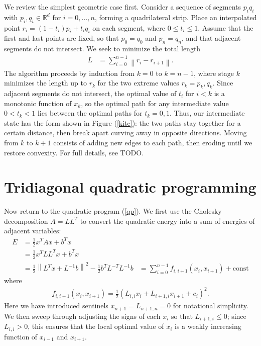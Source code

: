 \documentclass[11pt]{article}
\newcommand{\TODO}{{\color{red} TODO}}
\begin{document}
We review the simplest geometric case first.  Consider a sequence of segments $p_i q_i$ with $p_i, q_i \in \mathbb{R}^d$ for $i = 0, \ldots, n$, forming a quadrilateral strip.  Place an interpolated point
$r_i = (1-t_i) p_i + t_i q_i$ on each segment, where $0 \le t_i \le 1$.  Assume that the first and last points are fixed, so that $p_0 = q_0$ and $p_n = q_n$, and that adjacent segments do not intersect.
We seek to minimize the total length
\begin{align*}
L &= \sum_{i=0}^{n-1} \left\| r_i - r_{i+1} \right\|.
\end{align*}
The algorithm proceeds by induction from $k = 0$ to $k = n-1$, where stage $k$ minimizes the length up to $r_k$ for the two extreme values $r_k = p_k, q_k$.  Since adjacent segments do not intersect, the optimal value
of $t_i$ for $i < k$ is a monotonic function of $x_k$, so the optimal path for any intermediate value $0 < t_k < 1$ lies between the optimal paths for $t_k = 0,1$.  Thus, our intermediate state has the form shown in
Figure (\ref{kite}): the two paths stay together for a certain distance, then break apart curving away in opposite directions.  Moving from $k$ to $k+1$ consists of adding new edges to each path, then eroding until
we restore convexity.  For full details, see \TODO.

\section{Tridiagonal quadratic programming}

Now return to the quadratic program (\ref{qp}).  We first use the Cholesky decomposition $A = L L^T$ to convert the quadratic energy into a sum of energies of adjacent variables:
\begin{align*}
E &= \frac{1}{2} x^T A x + b^T x  \\
  &= \frac{1}{2} x^T L L^T x + b^T x \\
  &= \frac{1}{2} \left\|L^T x + L^{-1}b \right\|^2 - \frac{1}{2} b^T L^{-T} L^{-1} b
  &= \sum_{i=0}^{n-1} f_{i,i+1}(x_i,x_{i+1}) + \textrm{const}
\end{align*}
where
\begin{align} \label{quadratic}
f_{i,i+1}(x_i,x_{i+1}) = \frac{1}{2} (L_{i,i} x_i + L_{i+1,i} x_{i+1} + c_i)^2.
\end{align}
Here we have introduced sentinels $x_{n+1} = L_{n+1,n} = 0$ for notational simplicity.  We then sweep through adjusting the signs of each $x_i$ so that $L_{i+1,i} \le 0$; since $L_{i,i} > 0$, this
ensures that the local optimal value of $x_i$ is a weakly increasing function of $x_{i-1}$ and $x_{i+1}$.
\end{document}
